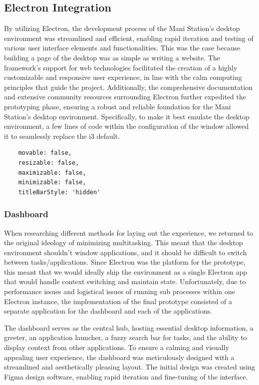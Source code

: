 \documentclass[letterpaper,twocolumn,10pt]{article}
\begin{document}
\subsection{Electron Integration}
By utilizing Electron, the development process of the Mani Station's desktop environment was streamlined and efficient, enabling rapid iteration and testing of various user interface elements and functionalities. This was the case because building a page of the desktop was as simple as writing a website. The framework's support for web technologies facilitated the creation of a highly customizable and responsive user experience, in line with the calm computing principles that guide the project. Additionally, the comprehensive documentation and extensive community resources surrounding Electron further expedited the prototyping phase, ensuring a robust and reliable foundation for the Mani Station's desktop environment. Specifically, to make it best emulate the desktop environment, a few lines of code within the configuration of the window allowed it to seamlessly replace the i3 default.
\begin{verbatim}
    movable: false,
    resizable: false,
    maximizable: false,
    minimizable: false,
    titleBarStyle: 'hidden'
\end{verbatim}

\subsubsection{Dashboard}

When researching different methods for laying out the experience, we returned to the original ideology of minimizing multitasking. This meant that the desktop environment shouldn’t window applications, and it should be difficult to switch between tasks/applications. Since Electron was the platform for the prototype, this meant that we would ideally ship the environment as a single Electron app that would handle context switching and maintain state. Unfortunately, due to performance issues and logistical issues of running sub processes within one Electron instance, the implementation of the final prototype consisted of a separate application for the dashboard and each of the applications.

The dashboard serves as the central hub, hosting essential desktop information, a greeter, an application launcher, a fuzzy search bar for tasks, and the ability to display context from other applications. To ensure a calming and visually appealing user experience, the dashboard was meticulously designed with a streamlined and aesthetically pleasing layout. The initial design was created using Figma design software, enabling rapid iteration and fine-tuning of the interface.
\end{document}
